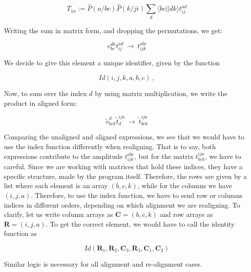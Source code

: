 \documentclass[10pt,twoside]{report}
\begin{document}
	\begin{equation}
		T_{1a} := \hat{P}(a/bc)\hat{P}(k/ji)\sum_d \langle bc|| dk\rangle t_{ij}^{ad}
	\end{equation}
	
	Writing the sum in matrix form, and dropping the permutations, we get:
	
	\begin{equation*}
		v_{bc}^{dk}t_{ij}^{ad} \:\rightarrow\: t_{ijk}^{abc}
	\end{equation*}
	
	We decide to give this element a unique identifier, given by the function
	
	\begin{equation*}
		Id(i,j,k,a,b,c) \:,
	\end{equation*}
	
	Now, to sum over the index $d$ by using matrix multiplication, we write the product in aligned form:
	
	\begin{equation*}
		\tilde{v}_{bck}^{d}\tilde{t}_{d}^{ija} \:\rightarrow\: \tilde{t}_{bck}^{ija}
	\end{equation*}
	
	Comparing the unaligned and aligned expressions, we see that we would have to use the index function differently when realigning. That is to say, both expressions contribute to the amplitude $t_{ijk}^{abc}$, 
	but for the matrix $t_{bck}^{ija}$, we have to careful. Since we are working with matrices that hold these indices, they have a specific structure, made by the program itself. Therefore, the rows are given by a list where each element is an array $(b,c,k)$, while for the columns we have $(i,j,a)$. Therefore, to use the index function, we have to send row or columns indices in different orders, depending on which alignment we are realigning. To clarify, let us write column arrays as $\bm{C} = (b,c,k)$ and row arrays as $\bm{R} = (i,j,a)$. To get the correct element, we would have to call the identity function as
	
	\begin{equation*}
		Id(\bm{R}_1, \bm{R}_2, \bm{C}_3, \bm{R}_3, \bm{C}_1, \bm{C}_2)
	\end{equation*}
	
	Similar logic is necessary for all alignment and re-alignment cases.
	

	
\end{document}
